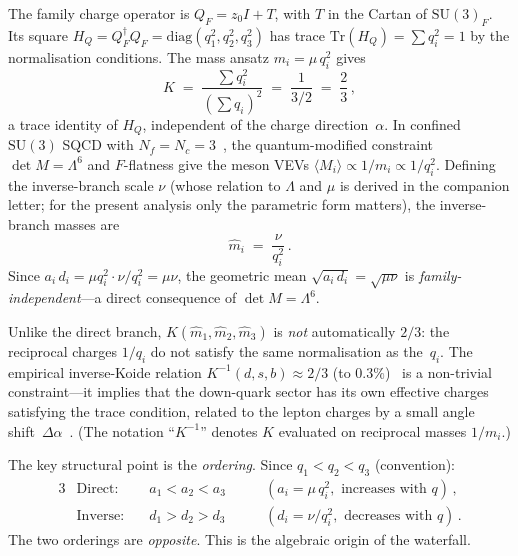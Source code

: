 \documentclass[preprint,12pt]{elsarticle}
\newcommand{\SU}{\mathrm{SU}}
\newcommand{\Nf}{N_{\!f}}
\newcommand{\Nc}{N_{\!c}}
\newcommand{\Tr}{\mathrm{Tr}}
\newcommand{\diag}{\mathrm{diag}}
\begin{document}
The family charge operator is
$Q_F = z_0 I + T$, with $T$ in the Cartan of $\SU(3)_F$.
Its square $H_Q = Q_F^\dagger Q_F = \diag(q_1^2, q_2^2, q_3^2)$
has trace $\Tr(H_Q) = \sum q_i^2 = 1$ by the normalisation
conditions.  The mass ansatz $m_i = \mu\,q_i^2$ gives
\begin{equation}
  K \;=\; \frac{\sum q_i^2}{(\sum q_i)^2}
  \;=\; \frac{1}{3/2} \;=\; \frac{2}{3}\,,
  \label{eq:K_trace}
\end{equation}
a trace identity of $H_Q$, independent of the charge direction~$\alpha$.
In confined $\SU(3)$ SQCD with $\Nf = \Nc = 3$~\cite{Seiberg:1994,CSS:1996,IS:1995},
the quantum-modified constraint $\det M = \Lambda^6$ and
$F$-flatness give the meson VEVs $\langle M_i \rangle \propto 1/m_i
\propto 1/q_i^2$.  Defining the inverse-branch scale
$\nu$ (whose relation to $\Lambda$ and $\mu$ is derived
in the companion letter; for the present analysis
only the parametric form matters),
the inverse-branch masses are
\begin{equation}
  \hat{m}_i \;=\; \frac{\nu}{q_i^2}\,.
  \label{eq:inverse}
\end{equation}
Since $a_i\,d_i = \mu q_i^2 \cdot \nu/q_i^2 = \mu\nu$,
the geometric mean $\sqrt{a_i\,d_i} = \sqrt{\mu\nu}$ is
\emph{family-independent}---a direct consequence of
$\det M = \Lambda^6$.

Unlike the direct branch, $K(\hat{m}_1, \hat{m}_2, \hat{m}_3)$
is \emph{not} automatically $2/3$: the reciprocal charges
$1/q_i$ do not satisfy the same normalisation as the~$q_i$.
The empirical inverse-Koide relation
$K^{-1}(d,s,b) \approx 2/3$ (to $0.3\%$)~\cite{Rivero:2005}
is a non-trivial constraint---it implies that the down-quark
sector has its own effective charges satisfying
the trace condition, related to the lepton charges by
a small angle shift~$\Delta\alpha$~\cite{letter_q2}.
(The notation ``$K^{-1}$'' denotes $K$ evaluated on
reciprocal masses $1/m_i$.)

The key structural point is the \emph{ordering}.
Since $q_1 < q_2 < q_3$ (convention):
\begin{alignat}{3}
  &\text{Direct:}\quad  & a_1 < a_2 < a_3 \qquad
  & (a_i = \mu\,q_i^2, \text{ increases with } q)\,,
  \label{eq:direct_order} \\
  &\text{Inverse:}\quad & d_1 > d_2 > d_3 \qquad
  & (d_i = \nu/q_i^2, \text{ decreases with } q)\,.
  \label{eq:inverse_order}
\end{alignat}
The two orderings are \emph{opposite}.
This is the algebraic origin of the waterfall.
\end{document}
